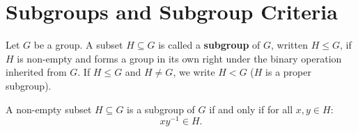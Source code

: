 \section{Subgroups and Subgroup Criteria}
\label{sec:subgroups}

\begin{definition}[Subgroup]
Let $G$ be a group. A subset $H \subseteq G$ is called a \textbf{subgroup} of $G$, written $H \le G$, if $H$ is non-empty and forms a group in its own right under the binary operation inherited from $G$. If $H \le G$ and $H \ne G$, we write $H < G$ ($H$ is a proper subgroup).
\end{definition}

\begin{proposition}
\label{prop:subgroup_one_step}
A non-empty subset $H \subseteq G$ is a subgroup of $G$ if and only if for all $x, y \in H$:
\begin{equation}
xy^{-1} \in H.
\end{equation}
\end{proposition}

